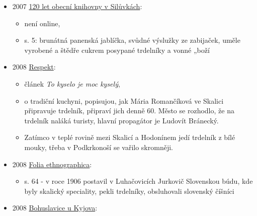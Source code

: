 \begin{itemize}
  \begin{itemize}
  \tightlist
  \item
  \item
    není online, 
  \item
    původně to vyšlo v roce 1913, ale asi to není digitalizovaný
  \item
    v NK: ve studovně STUD. SPOL. A PŘÍR. VĚD požádejte u služby - za
    pultem SSV 908(437.3) VLA 58 Ř.II.Díl VI.Č.34 54 E 002620/Ř.II.Díl
    VI.Č.34.Mor.-Krumlovský okres
  \item
    s. 55: čerstvého vepřového sádla ; trdelníky (smažené) nosí
    hospodyně šestinedělkám „do kouta``. Velmi rozšířeným je nyní
    všeobecné
  \end{itemize}
\item
  2007
  \href{https://www.digitalniknihovna.cz/mzk/uuid/uuid:6bfca690-1bc3-11e4-8f64-005056827e52}{120
  let obecní knihovny v Silůvkách}:

  \begin{itemize}
  \tightlist
  \item
    není online, 
  \item
    s. 5: brunátná panenská jablíčka, svůdné výslužky ze zabijaček,
    uměle vyrobené a štědře cukrem posypané trdelníky a vonné „boží
  \end{itemize}
\item
  2008
  \href{https://ceskadigitalniknihovna.cz/uuid/uuid:e0d7de90-55fc-11e3-bc9f-5ef3fc9bb22f}{Respekt}:

  \begin{itemize}
  \tightlist
  \item
    článek \emph{To kyselo je moc kyselý},
  \item
    o tradiční kuchyni, popisujou, jak Mária Romančíková ve Skalici
    připravuje trdelník, připraví jich denně 60. Město se rozhodlo, že
    na trdelník naláká turisty, hlavní propagátor je Ludovít Bránecký.
  \item
    Zatímco v teplé rovině mezi Skalicí a Hodonínem jedí trdelník z bílé
    mouky, třeba v Podkrkonoší se vařilo skromněji.
  \end{itemize}
\item
  2008
  \href{https://ndk.cz/uuid/uuid:d30cd530-5bfb-11e4-97e9-5ef3fc9bb22f}{Folia
  ethnographica}:

  \begin{itemize}
  \tightlist
  \item
    s. 64 - v roce 1906 postavil v Luhačovicích Jurkovič Slovenskou
    búdu, kde byly skalický speciality, pekli trdelníky, obsluhovali
    slovenský číšníci
  \end{itemize}
\item
  2008
  \href{https://ceskadigitalniknihovna.cz/uuid/uuid:0986bb00-6623-11e3-ae59-005056827e52}{Bohuslavice
  u Kyjova}:


\end{itemize}
